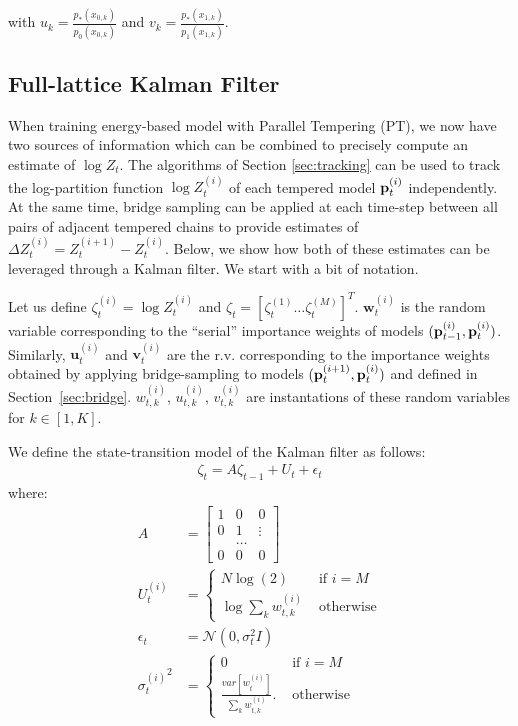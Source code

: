 \documentclass{article}
\begin{document}
with 
$u_k = \frac{p_*(x_{0,k})}{p_0(x_{0,k})}$ and
$v_k = \frac{p_*(x_{1,k})}{p_1(x_{1,k})}$.


\bigskip
\subsection{Full-lattice Kalman Filter}

\def\w{\mathbf{w}}
\def\u{\mathbf{u}}
\def\v{\mathbf{v}}

When training energy-based model with Parallel Tempering (PT), we now have two
sources of information which can be combined to precisely compute an estimate
of $\log Z_t$. The algorithms of Section \ref{sec:tracking} can be used to
track the log-partition function $\log Z_t^{(i)}$ of each tempered model
$\mathbf{p}_t^{(i)}$ independently. At the same time, bridge sampling can be applied at
each time-step between all pairs of adjacent tempered chains to provide
estimates of $\Delta Z_t^{(i)} = Z_t^{(i+1)} - Z_t^{(i)}$. Below, we show how
both of these estimates can be leveraged through a Kalman filter. We start with
a bit of notation. 

\bigskip
Let us define
$\zeta_t^{(i)} = \log Z_t^{(i)}$ and 
$\zeta_t = [\zeta_t^{(1)} \ldots \zeta_t^{(M)}]^T$. $\w_t^{(i)}$ is the random
variable corresponding to the ``serial'' importance weights of models
$(\mathbf{p}_{t-1}^{(i)},\mathbf{p}_t^{(i)})$. Similarly, $\u_t^{(i)}$ and $\v_t^{(i)}$ are the
r.v. corresponding to the importance weights obtained by applying
bridge-sampling to models $(\mathbf{p}_t^{(i+1)},\mathbf{p}_t^{(i)})$ and defined in
Section~\ref{sec:bridge}.  $w_{t,k}^{(i)}$, $u_{t,k}^{(i)}$, $v_{t,k}^{(i)}$
are instantations of these random variables for $k \in [1,K]$.

\bigskip
We define the state-transition model of the Kalman filter as follows:
\begin{align}
    \zeta_t = A \zeta_{t-1} + U_t + \epsilon_t
\end{align}
where:
\begin{align}
A &=\left[ \begin{array}{rrr}
     1 & 0      &  0      \\
     0 & 1      &  \vdots \\
       & \ldots &         \\
     0 & 0      &  0 
\end{array} \right] \nonumber \\
U_t^{(i)} &= \left\{ \begin{array}{ll}
     N \log(2)                 & \text{ if } i=M \\
     \log \sum_k w_{t,k}^{(i)} & \text{ otherwise}
\end{array} \right. \nonumber \\
    \epsilon_t &= \mathcal{N}(0, \sigma_t^2 I) \nonumber \\
{\sigma_t^{(i)}}^2 &= \left\{ \begin{array}{ll}
     0                         & \text{ if } i=M \\
     \frac {var[w_t^{(i)}]} {\sum_k w_{t,k}^{(i)}}. & \text{ otherwise}
\end{array} \right. \nonumber
\end{align}
\end{document}
